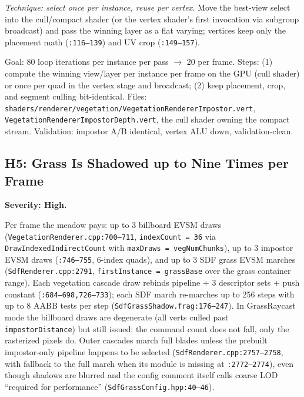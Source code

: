 \documentclass[11pt,a4paper]{article}
\begin{document}
\textit{Technique: select once per instance, reuse per vertex.} Move the
best-view select into the cull/compact shader (or the vertex shader's first
invocation via subgroup broadcast) and pass the winning layer as a flat
varying; vertices keep only the placement math
(\texttt{:116--139}) and UV crop (\texttt{:149--157}).

\begin{tcolorbox}[promptbox={Prompt --- H4: per-instance best-view select}]
Goal: 80 loop iterations per instance per pass $\rightarrow$ 20 per frame.
Steps: (1) compute the winning view/layer per instance per frame on the GPU
(cull shader) or once per quad in the vertex stage and broadcast; (2) keep
placement, crop, and segment culling bit-identical. Files:
\texttt{shaders/renderer/vegetation/VegetationRendererImpostor.vert},
\texttt{VegetationRendererImpostorDepth.vert}, the cull shader owning the
compact stream. Validation: impostor A/B identical, vertex ALU down,
validation-clean.
\end{tcolorbox}

\subsection{H5: Grass Is Shadowed up to Nine Times per Frame}

\textbf{Severity: High.}

Per frame the meadow pays: up to 3 billboard EVSM draws
(\texttt{VegetationRenderer.cpp:700--711}, \texttt{indexCount = 36} via
\texttt{DrawIndexedIndirectCount} with \texttt{maxDraws = vegNumChunks}),
up to 3 impostor EVSM draws (\texttt{:746--755}, 6-index quads), and up to 3
SDF grass EVSM marches (\texttt{SdfRenderer.cpp:2791},
\texttt{firstInstance = grassBase} over the grass container range). Each
vegetation cascade draw rebinds pipeline + 3 descriptor sets + push constant
(\texttt{:684--698,726--733}); each SDF march re-marches up to 256 steps
with up to 8 AABB tests per step (\texttt{SdfGrassShadow.frag:176--247}).
In GrassRaycast mode the billboard draws are degenerate (all verts culled
past \texttt{impostorDistance}) but still issued: the command count does not
fall, only the rasterized pixels do. Outer cascades march full blades unless
the prebuilt impostor-only pipeline happens to be selected
(\texttt{SdfRenderer.cpp:2757--2758}, with fallback to the full march when
its module is missing at \texttt{:2772--2774}), even though shadows are
blurred and the config comment itself calls coarse LOD ``required for
performance'' (\texttt{SdfGrassConfig.hpp:40--46}).
\end{document}
